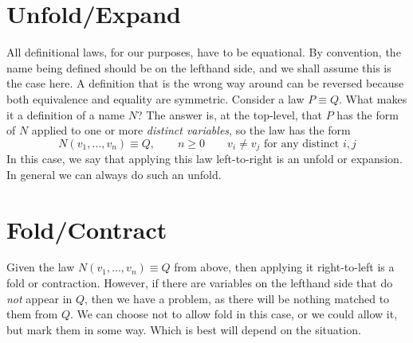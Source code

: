 \section{Unfold/Expand} 

All definitional laws, for our purposes, have to be equational.
By convention, the name being defined should be on the lefthand side,
and we shall assume this is the case here.
A definition that is the wrong way around can be reversed because both
equivalence and equality are symmetric.
Consider a law $P \equiv Q$. What makes it a definition of a name $N$?
The answer is, 
at the top-level,
that $P$ has the form of $N$ applied to one or more \emph{distinct variables}, 
so the law has the form
$$
   N(v_1,\dots,v_n) \equiv Q, 
   \qquad n \geq 0
   \qquad v_i \neq v_j \mbox{ for any distinct } i,j
$$
In this case, we say that applying this law left-to-right
is an unfold or expansion.
In general we can always do such an unfold.


\section{Fold/Contract}

Given the law $N(v_1,\dots,v_n) \equiv Q$ from above,
then applying it right-to-left is a fold or contraction.
However, 
if there are variables on the lefthand side that do \emph{not} appear in $Q$,
then we have a problem, as there will be nothing matched to them from $Q$.
We can choose not to allow fold in this case,
or we could allow it, but mark them in some way.
Which is best will depend on the situation.


